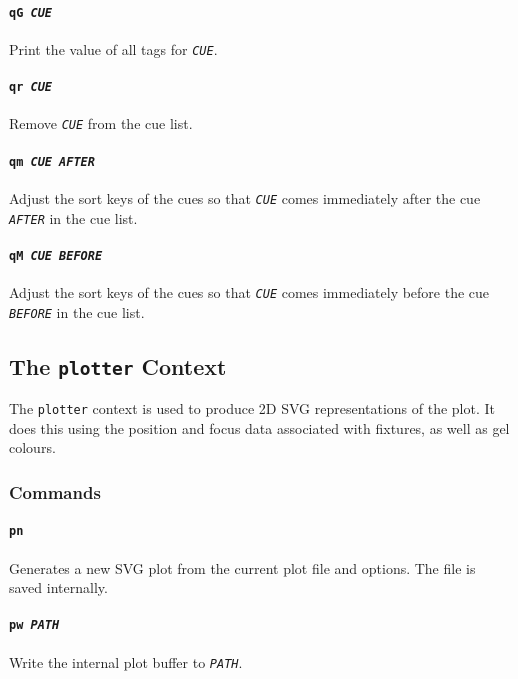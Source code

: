 \documentclass[a4paper]{article}
\begin{document}
\paragraph{\texttt{qG \textit{CUE}}}
Print the value of all tags for \texttt{\textit{CUE}}.

\paragraph{\texttt{qr \textit{CUE}}}
Remove \texttt{\textit{CUE}} from the cue list.

\paragraph{\texttt{qm \textit{CUE AFTER}}}
Adjust the sort keys of the cues so that \texttt{\textit{CUE}} comes 
immediately after the cue \texttt{\textit{AFTER}} in the cue list.

\paragraph{\texttt{qM \textit{CUE BEFORE}}}
Adjust the sort keys of the cues so that \texttt{\textit{CUE}} comes 
immediately before the cue \texttt{\textit{BEFORE}} in the cue list.

\subsection{The \texttt{plotter} Context}
The \texttt{plotter} context is used to produce 2D SVG representations of the 
plot. It does this using the position and focus data associated with fixtures, 
as well as gel colours.

\subsubsection{Commands}

\paragraph{\texttt{pn}}
Generates a new SVG plot from the current plot file and options. The file is 
saved internally.

\paragraph{\texttt{pw \textit{PATH}}}
Write the internal plot buffer to \texttt{\textit{PATH}}.
\end{document}

